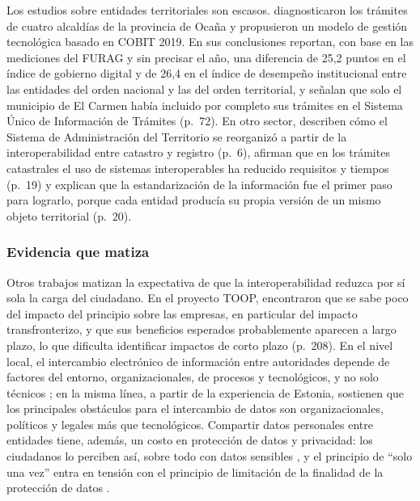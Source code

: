Los estudios sobre entidades territoriales son escasos. \textcite{marquezpinzon2023modelo} diagnosticaron los trámites de cuatro alcaldías de la provincia de Ocaña y propusieron un modelo de gestión tecnológica basado en COBIT 2019. En sus conclusiones reportan, con base en las mediciones del FURAG y sin precisar el año, una diferencia de 25,2 puntos en el índice de gobierno digital y de 26,4 en el índice de desempeño institucional entre las entidades del orden nacional y las del orden territorial, y señalan que solo el municipio de El Carmen había incluido por completo sus trámites en el Sistema Único de Información de Trámites (p.~72). En otro sector, \textcite{pinzonarana2025caracterizacion} describen cómo el Sistema de Administración del Territorio se reorganizó a partir de la interoperabilidad entre catastro y registro (p.~6), afirman que en los trámites catastrales el uso de sistemas interoperables ha reducido requisitos y tiempos (p.~19) y explican que la estandarización de la información fue el primer paso para lograrlo, porque cada entidad producía su propia versión de un mismo objeto territorial (p.~20).

\subsubsection{Evidencia que matiza}

Otros trabajos matizan la expectativa de que la interoperabilidad reduzca por sí sola la carga del ciudadano. En el proyecto TOOP, \textcite{timan2021measuring} encontraron que se sabe poco del impacto del principio sobre las empresas, en particular del impacto transfronterizo, y que sus beneficios esperados probablemente aparecen a largo plazo, lo que dificulta identificar impactos de corto plazo (p.~208). En el nivel local, el intercambio electrónico de información entre autoridades depende de factores del entorno, organizacionales, de procesos y tecnológicos, y no solo técnicos \parencite{bigdeli2013electronic}; en la misma línea, a partir de la experiencia de Estonia, \textcite{puura2026advancing} sostienen que los principales obstáculos para el intercambio de datos son organizacionales, políticos y legales más que tecnológicos. Compartir datos personales entre entidades tiene, además, un costo en protección de datos y privacidad: los ciudadanos lo perciben así, sobre todo con datos sensibles \parencite{akkaya2018towards}, y el principio de \enquote{solo una vez} entra en tensión con el principio de limitación de la finalidad de la protección de datos \parencite{mikiver2023gdpr}.

